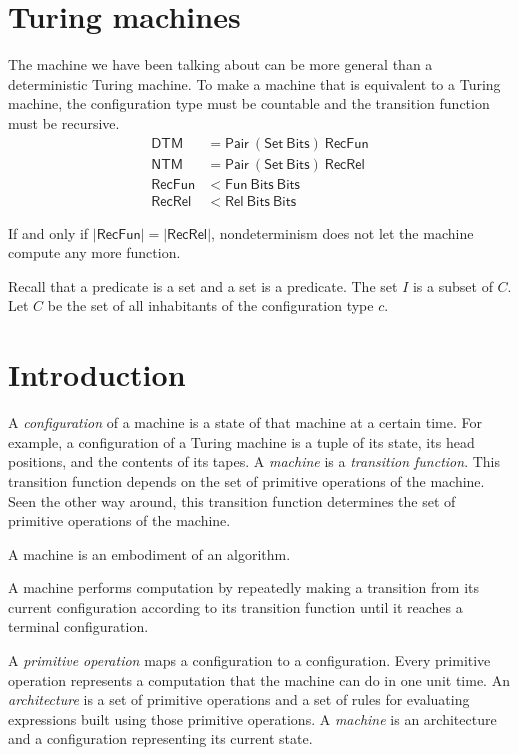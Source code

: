 \documentclass[10pt,statementpaper]{memoir}
\theoremstyle{definition}
\newcommand\Pair[2]{\mathsf{Pair}~#1~#2}
\newcommand\Bits{\mathsf{Bits}}
\newcommand\RecRel{\mathsf{RecRel}}
\newcommand\RecFun{\mathsf{RecFun}}
\newcommand\DTM{\mathsf{DTM}}
\newcommand\NTM{\mathsf{NTM}}
\newcommand\sfFun{\mathsf{Fun}}
\newcommand\sfSet{\mathsf{Set}}
\newcommand\sfRel{\mathsf{Rel}}
\newcommand\Set[1]{\sfSet~#1}
\newcommand\Relab[2]{\sfRel~#1~#2}
\newcommand\Fun[2]{\sfFun~#1~#2}
\begin{document}
\section{Turing machines}

The machine we have been talking about
can be more general than a deterministic Turing machine.
To make a machine that is equivalent to a Turing machine,
the configuration type must be countable
and the transition function must be recursive.
\begin{align*}
    \DTM &= \Pair{(\Set{\Bits})}{\RecFun}
    \\
    \NTM &= \Pair{(\Set{\Bits})}{\RecRel}
    \\
    \RecFun &< \Fun{\Bits}{\Bits}
    \\
    \RecRel &< \Relab{\Bits}{\Bits}
\end{align*}

If and only if $|\RecFun| = |\RecRel|$,
nondeterminism does not let the machine compute any more function.

Recall that a predicate is a set and a set is a predicate.
The set $I$ is a subset of $C$.
Let $C$ be the set of all inhabitants of the configuration type $c$.

\section{Introduction}

A \emph{configuration} of a machine is a state of that machine at a certain time.
For example, a configuration of a Turing machine is a tuple of its state,
its head positions, and the contents of its tapes.
A \emph{machine} is a \emph{transition function}.
This transition function depends on the set of primitive operations of the machine.
Seen the other way around, this transition function
determines the set of primitive operations of the machine.

A machine is an embodiment of an algorithm.

A machine performs computation by repeatedly
making a transition from its current configuration
according to its transition function
until it reaches a terminal configuration.

A \emph{primitive operation} maps a configuration to a configuration.
Every primitive operation represents a computation that the machine can do in one unit time.
An \emph{architecture} is a set of primitive operations
and a set of rules for evaluating expressions built using those primitive operations.
A \emph{machine} is an architecture and a configuration representing its current state.
\end{document}

